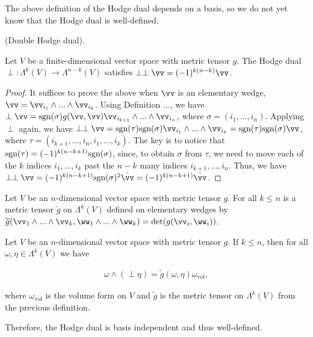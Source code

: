 \begin{remark}
    The above definition of the Hodge dual depends on a basis, so we do not yet know that the Hodge dual is well-defined.
\end{remark}

\begin{theorem}
    (Double Hodge dual).
    
    Let $V$ be a finite-dimensional vector space with metric tensor $g$. The Hodge dual $\perp:\Lambda^k(V) \rightarrow \Lambda^{n - k}(V)$ satisfies $\perp \perp \vv = (-1)^{k(n - k)} \vv$.
\end{theorem}

\begin{proof}
    It suffices to prove the above when $\vv$ is an elementary wedge, $\vv = \vv_{i_1} \wedge ... \wedge \vv_{i_k}$. Using Definition ..., we have $\perp \vv = \sgn(\sigma) g(\vv, \vv) \vv_{i_{k + 1}} \wedge ... \wedge \vv_{i_n}$, where $\sigma = (i_1, ..., i_n)$. Applying $\perp$ again, we have $\perp \perp \vv = \sgn(\tau) \sgn(\sigma) \vv_{i_1} \wedge ... \wedge \vv_{i_k} = \sgn(\tau) \sgn(\sigma) \vv$, where $\tau = (i_{k + 1}, ..., i_n, i_1, ..., i_k)$. The key is to notice that $\text{sgn}(\tau) = (-1)^{k(n - k + 1)} \text{sgn}(\sigma)$, since, to obtain $\sigma$ from $\tau$, we need to move each of the $k$ indices $i_1, ..., i_k$ past the $n - k$ many indices $i_{k + 1}, ..., i_n$. Thus, we have $\perp \perp \vv = (-1)^{k(n - k + 1)} \sgn(\sigma)^2 \hvv = (-1)^{k(n - k + 1)} \hvv$.
\end{proof}

\begin{theorem}
    Let $V$ be an $n$-dimensional vector space with metric tensor $g$. For all $k \leq n$ is a metric tensor $\widetilde{g}$ on $\Lambda^k(V)$ defined on elementary wedges by     $\widetilde{g}(\vv_1 \wedge ... \wedge \vv_k, \ww_1 \wedge ... \wedge \ww_k) = \det(g(\vv_i, \ww_i))$.
\end{theorem}

\begin{theorem}
    Let $V$ be an $n$-dimensional vector space with metric tensor $g$. If $k \leq n$, then for all $\omega, \eta \in \Lambda^k(V)$ we have

    \begin{align*}
        \omega \wedge (\perp \eta) = \widetilde{g}(\omega, \eta) \omega_{\text{vol}},
    \end{align*}
    
    where $\omega_{\text{vol}}$ is the volume form on $V$ and $\widetilde{g}$ is the metric tensor on $\Lambda^k(V)$ from the previous definition.
    
    Therefore, the Hodge dual is basis independent and thus well-defined.
\end{theorem}







